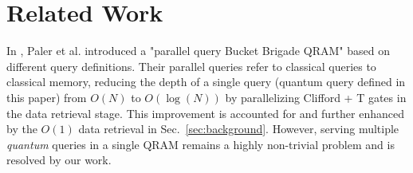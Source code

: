 \section{Related Work}
In \cite{paler2020parallelizing}, Paler et al. introduced a "parallel query Bucket Brigade QRAM" based on different query definitions. Their parallel queries refer to classical queries to classical memory, reducing the depth of a single query (quantum query defined in this paper) from $O(N)$ to $O(\log(N))$ by parallelizing Clifford + T gates in the data retrieval stage. This improvement is accounted for and further enhanced by the $O(1)$ data retrieval in Sec.~\ref{sec:background}. However, serving multiple \emph{quantum} queries in a single QRAM remains a highly non-trivial problem and is resolved by our work.